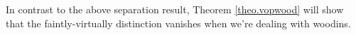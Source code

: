 \documentclass[../main]{subfiles}
\begin{document}
In contrast to the above separation result, Theorem \ref{theo.vopwood} will show that the faintly-virtually distinction vanishes when we're dealing with woodins.



\begin{comment}
\defi{
  \label{defi.strongsc}
  A cardinal $\kappa$ is...
  \begin{itemize}
    \item \textbf{faintly $\alpha$-superstrong} if it's faintly $\theta$-prestrong for some regular $\theta\geq\pi^\alpha(\kappa)$;
    \item \textbf{faintly $\alpha$-huge} if it's faintly $\theta$-presupercompact for some regular $\theta\geq\pi^\alpha(\kappa)$;
  \end{itemize}

  We replace ``faintly'' by \textbf{virtually} when $\N\subset V$, and when we don't specify any $\theta$ then it holds for \textbf{some} regular $\theta>\kappa$. When $\alpha=1$ we will usually leave it out.\footnote{So $\kappa$ is a faintly superstrong cardinal if there's a regular $\theta>\kappa$ and an elementary $\pi\colon H_\theta^V\to\N$ with $\crit\pi=\kappa$ and $H_{\pi(\kappa)}^V\subset\N$.}
}

With this terminology, by definition we have that every faintly $\theta$-prestrong cardinal is either faintly $\theta$-strong or faintly $\theta$-superstrong.

If we say that a cardinal $\kappa$ is \textit{virtually $n$-*huge} if it is virtually $n$-huge and the target model of the elementary embedding is of the form $H_\theta^V$ for some cardinal $\theta$, then Theorem 4.14 in \cite{GitmanSchindler} says the following.\footnote{In that paper they're working with $V_\alpha$'s instead of $H_\theta$'s, but the same proof goes through.}

\theo[G.-Schindler]{
  If $\kappa$ is $(n{+}2)$-iterable then
  \eq{
    H_\kappa^V\models\godel{\text{there is a proper class of virtually $n$-*huge cardinals}}.\tag*{$\dashv$}
  }
}

Note that every virtually $n$-*huge cardinal is a limit of virtually $n$-huge cardinals by an argument similar to Theorem \ref{theo.rem}, this also gives an upper bound for the virtually $n$-huge cardinals.\footnote{The point is that when $\kappa$ is virtually $n$-*huge then the target model of the embedding has strictly larger size than the domain.} As for a lower bound, the proof of Theorem 4.20 of \cite{GitmanSchindler} gives the following.

\qtheo[G.-Schindler]{
  Every virtually $n$-superstrong cardinal is an $(n{+}1)$-iterable limit of $(n{+}1)$-iterable cardinals.
}

\ques{
  Are virtually $\theta$-superstrong cardinals equivalent to virtually $\theta$-huge cardinals? This question seems to be true if and only if Question \ref{ques.remarkableequiv} is true.
}
\end{comment}
\end{document}
